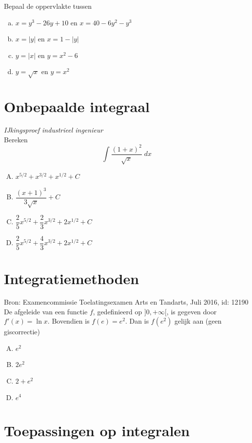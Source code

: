\documentclass[a4paper,12pt, twoside]{article}
\begin{document}
\begin{oefening}
Bepaal de oppervlakte tussen
\begin{enumerate}[(a)]
\itemsep1em
  \item $x=y^3-26y+10$ en $x=40-6y^2-y^3$
  \item $x=|y|$ en $x=1-|y|$
  \item $y=|x|$ en $y=x^2-6$
  \item $y=\sqrt{x}$ en $y=x^2$
\end{enumerate}
\end{oefening}

\cleardoublepage
\section{Onbepaalde integraal}

\begin{oefening} {\scriptsize \em IJkingsproef industrieel ingenieur}\\
Bereken
$$\int \dfrac{(1+x)^2}{\sqrt{x}}\;dx$$
\begin{enumerate}[(A)]
\itemsep.5em
  \item $x^{5/2}+x^{3/2}+x^{1/2} + C$
  \item $\dfrac{(x+1)^3}{3\sqrt{x}} + C$
  \item $\dfrac{2}{5}x^{5/2}+\dfrac{2}{3}x^{3/2}+2x^{1/2} + C$
  \item $\dfrac{2}{5}x^{5/2}+\dfrac{4}{3}x^{3/2}+2x^{1/2} + C$
\end{enumerate}
\end{oefening}

\cleardoublepage
\section{Integratiemethoden}


\begin{oefening}{\scriptsize Bron: Examencommissie Toelatingsexamen Arts en Tandarts, Juli 2016, id: 12190}\\
De afgeleide van een functie $f$, gedefinieerd op $]0,+\infty[$, is gegeven door $f'(x)=\ln x$. Bovendien is $f(e)=e^2$. Dan is $f(e^2)$ gelijk aan \hfill(geen giscorrectie)
\begin{enumerate}[(A)]
  \itemsep.5em
  \item $e^2$
  \item $2e^2$
  \item $2+e^2$
  \item $e^4$
\end{enumerate}
\end{oefening}

\cleardoublepage
\section{Toepassingen op integralen}
\end{document}
